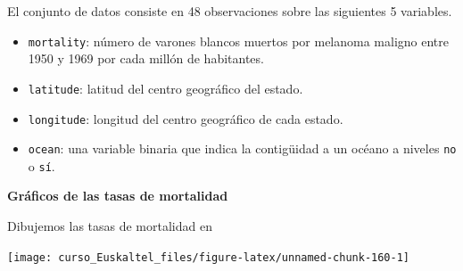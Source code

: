 \documentclass[]{book}
\newenvironment{Shaded}{\begin{snugshade}}{\end{snugshade}}
\newcommand{\KeywordTok}[1]{\textcolor[rgb]{0.13,0.29,0.53}{\textbf{#1}}}
\newcommand{\DataTypeTok}[1]{\textcolor[rgb]{0.13,0.29,0.53}{#1}}
\newcommand{\DecValTok}[1]{\textcolor[rgb]{0.00,0.00,0.81}{#1}}
\newcommand{\FloatTok}[1]{\textcolor[rgb]{0.00,0.00,0.81}{#1}}
\newcommand{\StringTok}[1]{\textcolor[rgb]{0.31,0.60,0.02}{#1}}
\newcommand{\CommentTok}[1]{\textcolor[rgb]{0.56,0.35,0.01}{\textit{#1}}}
\newcommand{\OtherTok}[1]{\textcolor[rgb]{0.56,0.35,0.01}{#1}}
\newcommand{\OperatorTok}[1]{\textcolor[rgb]{0.81,0.36,0.00}{\textbf{#1}}}
\newcommand{\NormalTok}[1]{#1}
\begin{document}
El conjunto de datos consiste en 48 observaciones sobre las siguientes 5
variables.

\begin{itemize}
\item
  \texttt{mortality}: número de varones blancos muertos por melanoma
  maligno entre 1950 y 1969 por cada millón de habitantes.
\item
  \texttt{latitude}: latitud del centro geográfico del estado.
\item
  \texttt{longitude}: longitud del centro geográfico de cada estado.
\item
  \texttt{ocean}: una variable binaria que indica la contigüidad a un
  océano a niveles \texttt{no} o \texttt{sí}.
\end{itemize}

\textbf{Gráficos de las tasas de mortalidad}

\begin{Shaded}
\end{Shaded}

Dibujemos las tasas de mortalidad en

\begin{Shaded}
\end{Shaded}

\begin{center}\texttt{[image: curso\_Euskaltel\_files/figure-latex/unnamed-chunk-160-1]} \end{center}

\begin{Shaded}
\end{Shaded}
\end{document}
